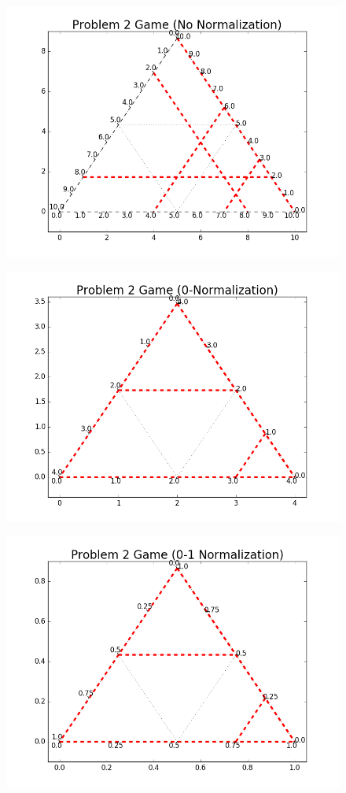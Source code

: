 \documentclass{article}
\begin{document}
\begin{enumerate}
\begin{enumerate}
    \begin{figure}[h!]
      \centering
      \includegraphics[width=.4\linewidth]{02_c_original}
      \label{fig:02_c_original}
    \end{figure}
    
    \begin{figure}[h!]
    \centering
    \begin{minipage}{.5\textwidth}
      \centering
      \includegraphics[width=.7\linewidth]{02_c_0norm}
      \label{fig:02_c_0norm}
    \end{minipage}%
    \begin{minipage}{.5\textwidth}
      \centering
      \includegraphics[width=.7\linewidth]{02_c_01norm}
      \label{fig:02_c_01norm}
    \end{minipage}
  \end{figure}


\end{enumerate}
\end{enumerate}
\end{document}
